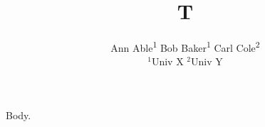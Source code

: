 \documentclass{article}
\title{T}
\author{Ann Able\textsuperscript{1} \quad Bob\linebreak[0]{} Baker\textsuperscript{1} \NewAnd Carl Cole\textsuperscript{2}\\ $^1$Univ X \quad $^2$Univ Y}
\begin{document}
\maketitle
Body.
\end{document}
